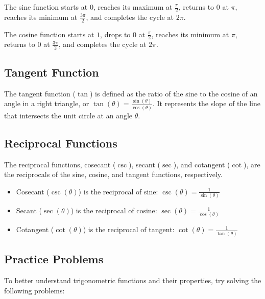 \documentclass[a4paper,12pt]{book}
\newcounter{problem}
\begin{document}
The sine function starts at \(0\), reaches its maximum at \(\frac{\pi}{2}\), returns to \(0\) at \(\pi\), reaches its minimum at \(\frac{3\pi}{2}\), and completes the cycle at \(2\pi\).

The cosine function starts at \(1\), drops to \(0\) at \(\frac{\pi}{2}\), reaches its minimum at \(\pi\), returns to \(0\) at \(\frac{3\pi}{2}\), and completes the cycle at \(2\pi\).

\subsection{Tangent Function}
\label{subsec:tangent_function}
The tangent function (\(\tan\)) is defined as the ratio of the sine to the cosine of an angle in a right triangle, or \(\tan(\theta) = \frac{\sin(\theta)}{\cos(\theta)}\). It represents the slope of the line that intersects the unit circle at an angle \(\theta\).

\subsection{Reciprocal Functions}
\label{subsec:reciprocal_functions}
The reciprocal functions, cosecant (\(\csc\)), secant (\(\sec\)), and cotangent (\(\cot\)), are the reciprocals of the sine, cosine, and tangent functions, respectively.

\begin{itemize}
  \item Cosecant (\(\csc(\theta)\)) is the reciprocal of sine: \(\csc(\theta) = \frac{1}{\sin(\theta)}\)
  \item Secant (\(\sec(\theta)\)) is the reciprocal of cosine: \(\sec(\theta) = \frac{1}{\cos(\theta)}\)
  \item Cotangent (\(\cot(\theta)\)) is the reciprocal of tangent: \(\cot(\theta) = \frac{1}{\tan(\theta)}\)
\end{itemize}


\subsection{Practice Problems}
\label{subsec:practice_problems}

To better understand trigonometric functions and their properties, try solving the following problems:
\end{document}
